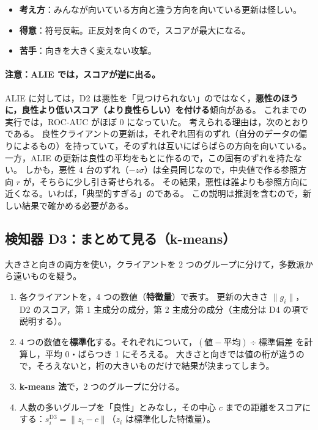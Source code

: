 \documentclass[a4j, dvipdfmx]{jsarticle}  %
\begin{document}
\begin{itemize}
  \item \textbf{考え方}：みんなが向いている方向と違う方向を向いている更新は怪しい。
  \item \textbf{得意}：符号反転。正反対を向くので，スコアが最大になる。
  \item \textbf{苦手}：向きを大きく変えない攻撃。
\end{itemize}

\paragraph{注意：ALIE では，スコアが逆に出る。}
ALIE に対しては，D2 は悪性を「見つけられない」のではなく，\textbf{悪性のほうに，良性より低いスコア（より良性らしい）を付ける}傾向がある。
これまでの実行では，ROC-AUC がほぼ 0 になっていた。
考えられる理由は，次のとおりである。
良性クライアントの更新は，それぞれ固有のずれ（自分のデータの偏りによるもの）を持っていて，そのずれは互いにばらばらの方向を向いている。
一方，ALIE の更新は良性の平均をもとに作るので，この固有のずれを持たない。
しかも，悪性 4 台のずれ（$-z\sigma$）は全員同じなので，中央値で作る参照方向 $r$ が，そちらに少し引き寄せられる。
その結果，悪性は誰よりも参照方向に近くなる。いわば，「典型的すぎる」のである。
この説明は推測を含むので，新しい結果で確かめる必要がある。

\subsection{検知器 D3：まとめて見る（k-means）}

大きさと向きの両方を使い，クライアントを 2 つのグループに分けて，多数派から遠いものを疑う。

\begin{enumerate}
  \item 各クライアントを，4 つの数値（\textbf{特徴量}）で表す。
        更新の大きさ $\|g_i\|$，D2 のスコア，第 1 主成分の成分，第 2 主成分の成分（主成分は D4 の項で説明する）。
  \item 4 つの数値を\textbf{標準化}する。それぞれについて，$(\text{値} - \text{平均}) \div \text{標準偏差}$ を計算し，平均 0・ばらつき 1 にそろえる。
        大きさと向きでは値の桁が違うので，そろえないと，桁の大きいものだけで結果が決まってしまう。
  \item \textbf{k-means 法}で，2 つのグループに分ける。
  \item 人数の多いグループを「良性」とみなし，その中心 $c$ までの距離をスコアにする：$s_i^{\mathrm{D3}} = \|z_i - c\|$（$z_i$ は標準化した特徴量）。
\end{enumerate}
\end{document}

